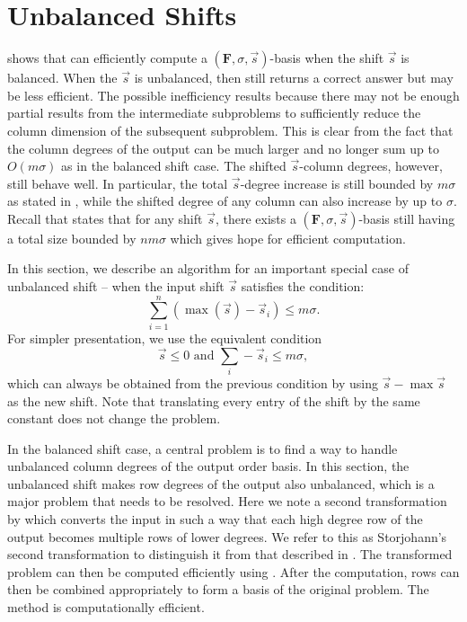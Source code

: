 
\section{Unbalanced Shifts}

\label{sec:Unbalanced-Shift}

 shows that  can efficiently
compute a $\left(\mathbf{F},\sigma,\vec{s}\right)$-basis when the
shift $\vec{s}$ is balanced. When the $\vec{s}$ is unbalanced, then
 still returns a correct answer but may be less
efficient. The possible inefficiency results because there may not
be enough partial results from the intermediate subproblems to sufficiently
reduce the column dimension of the subsequent subproblem. This is
clear from the fact that the column degrees of the output can be much
larger and no longer sum up to $O\left(m\sigma\right)$ as in the
balanced shift case. The shifted $\vec{s}$-column degrees, however,
still behave well. In particular, the total $\vec{s}$-degree increase
is still bounded by $m\sigma$ as stated in ,
while the shifted degree of any column can also increase by up to
$\sigma$. Recall that  states that for any shift
$\vec{s}$, there exists a $\left(\mathbf{F},\sigma,\vec{s}\right)$-basis
still having a total size bounded by $nm\sigma$ which gives hope
for efficient computation.

In this section, we describe an algorithm for an important special
case of unbalanced shift -- when the input shift $\vec{s}$ satisfies
the condition:\[
\sum_{i=1}^{n}(\max(\vec{s})-\vec{s}_{i})\le m\sigma.\]
 For simpler presentation, we use the equivalent condition \begin{equation}
\vec{s}\le0\mbox{ and }\sum_{i}-\vec{s}_{i}\le m\sigma,\label{con:unbalancedCondition}\end{equation}
 which can always be obtained from the previous condition by using
$\vec{s}-\max\vec{s}$ as the new shift. Note that translating every
entry of the shift by the same constant does not change the problem.

In the balanced shift case, a central problem is to find a way to
handle unbalanced column degrees of the output order basis. In this
section, the unbalanced shift makes row degrees of the output also
unbalanced, which is a major problem that needs to be resolved. Here
we note a second transformation by \citet{Storjohann:2006} which
converts the input in such a way that each high degree row of the
output becomes multiple rows of lower degrees. We refer to this as
Storjohann's second transformation to distinguish it from that described
in . The transformed problem
can then be computed efficiently using . After
the computation, rows can then be combined appropriately to form a
basis of the original problem. The method is computationally efficient.

